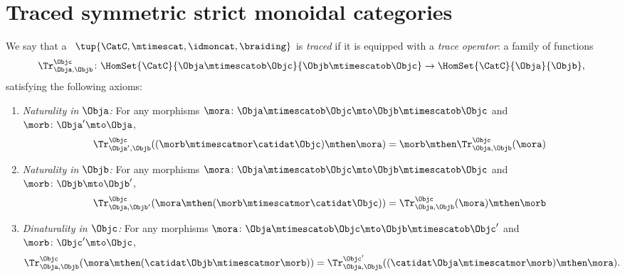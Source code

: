 
\section{Traced symmetric strict monoidal categories}




\begin{ctdefinition}
    \label{def:traced-strict-monoidal-cat}
    \label{def:traced-strict-monoidal-category}
    We say that a ~$\tup{\CatC, \mtimescat, \idmoncat, \braiding}$ is \emph{traced} if it is equipped with a \emph{trace operator}: a family of functions
    \begin{equation}
        \Tr_{\Obja,\Objb}^\Objc\colon \HomSet{\CatC}{\Obja \mtimescatob \Objc}{\Objb\mtimescatob \Objc}\to \HomSet{\CatC}{\Obja}{\Objb},
    \end{equation}
    satisfying the following axioms:
    \begin{enumerate}
        \item \emph{Naturality in $\Obja$:} For any morphisms $\mora\colon \Obja\mtimescatob \Objc \mto \Objb\mtimescatob \Objc$ and $\morb \colon \Obja' \mto \Obja$,
              \begin{equation}\label{eq:trace-naturality-1}
                  \Tr_{\Obja', \Objb}^\Objc ( (\morb \mtimescatmor \catidat\Objc) \mthen \mora) = \morb \mthen \Tr_{\Obja, \Objb}^\Objc (\mora)
              \end{equation}
        \item \emph{Naturality in $\Objb$:} For any morphisms $\mora\colon \Obja\mtimescatob \Objc \mto \Objb\mtimescatob \Objc$ and $\morb \colon \Objb \mto \Objb'$,
              \begin{equation}\label{eq:trace-naturality-2}
                  \Tr_{\Obja, \Objb'}^\Objc ( \mora \mthen (\morb \mtimescatmor \catidat\Objc) ) = \Tr_{\Obja, \Objb}^\Objc (\mora) \mthen \morb
              \end{equation}
        \item \emph{Dinaturality in $\Objc$:}
              For any morphisms $\mora \colon \Obja  \mtimescatob \Objc \mto \Objb \mtimescatob \Objc'$ and $\morb \colon \Objc' \mto \Objc$,
              \begin{equation}\label{eq:trace-dinaturality}
                  \Tr_{\Obja, \Objb}^{\Objc} (\mora \mthen (\catidat\Objb \mtimescatmor \morb)) = \Tr_{\Obja, \Objb}^{\Objc'}((\catidat\Obja \mtimescatmor \morb) \mthen \mora).
              \end{equation}


\end{enumerate}
\end{ctdefinition}
